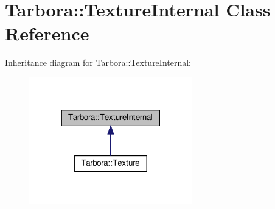 \hypertarget{classTarbora_1_1TextureInternal}{}\section{Tarbora\+:\+:Texture\+Internal Class Reference}
\label{classTarbora_1_1TextureInternal}


Inheritance diagram for Tarbora\+:\+:Texture\+Internal\+:\nopagebreak
\begin{figure}[H]
\begin{center}
\leavevmode
\includegraphics[width=201pt]{classTarbora_1_1TextureInternal__inherit__graph}
\end{center}
\end{figure}
